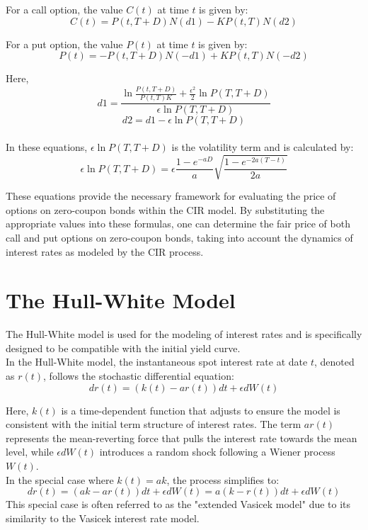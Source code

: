 \documentclass[a4paper,10pt]{article}
\begin{document}
\noindent For a call option, the value \( C(t) \) at time \( t \) is given by:
\[C(t) = P(t, T + D)N(d1) - KP(t, T)N(d2)\]

\noindent For a put option, the value \( P(t) \) at time \( t \) is given by:
\[P(t) = -P(t, T + D)N(-d1) + KP(t, T)N(-d2)\]

\noindent Here,
\[d1 = \frac{\ln \frac{P(t, T + D)}{P(t, T)K} + \frac{\epsilon^2}{2} \ln P(T, T + D)}{\epsilon \ln P(T, T + D)}\]
\[d2 = d1 - \epsilon \ln P(T, T + D)\]\\

\noindent In these equations, \( \epsilon \ln P(T, T + D) \) is the volatility term and is calculated by:
\[\epsilon \ln P(T, T + D) = \epsilon \frac{1 - e^{-aD}}{a} \sqrt{\frac{1 - e^{-2a(T-t)}}{2a}}\]

\noindent These equations provide the necessary framework for evaluating the price of options on zero-coupon bonds within the CIR model. By substituting the appropriate values into these formulas, one can determine the fair price of both call and put options on zero-coupon bonds, taking into account the dynamics of interest rates as modeled by the CIR process. \\

\section{The Hull-White Model}

\noindent The Hull-White model is used for the modeling of interest rates and is specifically designed to be compatible with the initial yield curve.\\

\noindent In the Hull-White model, the instantaneous spot interest rate at date \( t \), denoted as \( r(t) \), follows the stochastic differential equation:
\[dr(t) = (k(t) - ar(t))dt + \epsilon dW(t)\]

\noindent Here, \( k(t) \) is a time-dependent function that adjusts to ensure the model is consistent with the initial term structure of interest rates. The term \( ar(t) \) represents the mean-reverting force that pulls the interest rate towards the mean level, while \( \epsilon dW(t) \) introduces a random shock following a Wiener process \( W(t) \). \\

\noindent In the special case where \( k(t) = ak \), the process simplifies to:
\[dr(t) = (ak - ar(t))dt + \epsilon dW(t) = a(k - r(t))dt + \epsilon dW(t)\]
\noindent This special case is often referred to as the "extended Vasicek model" due to its similarity to the Vasicek interest rate model. \\
\end{document}
